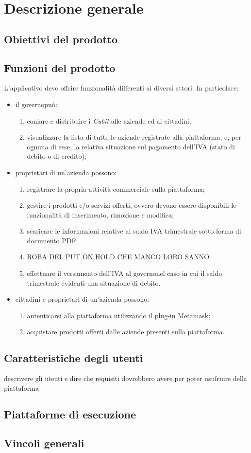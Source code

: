 \section{Descrizione generale} 
\subsection{Obiettivi del prodotto}

\subsection{Funzioni del prodotto}
L'applicativo devo offrire funzionalità differenti ai diversi attori. In particolare: 
\begin{itemize}
	\item il governo\glosp può:
	\begin{enumerate}[label=\alph*.]
		\item coniare e distribuire i \textit{Cubit} alle aziende ed ai cittadini;
		\item visualizzare la lista di tutte le aziende registrate alla piattaforma, e, per ognuna di esse, la relativa situazione sul pagamento dell'IVA (stato di debito o di credito); 
	\end{enumerate}
	
	\item proprietari di un'azienda possono:
	\begin{enumerate}[label=\alph*.]
		\item registrare la propria attività commerciale sulla piattaforma;
		\item gestire i prodotti e/o servizi offerti, ovvero devono essere disponibili le funzionalità di inserimento, rimozione e modifica;
		\item scaricare le informazioni relative al saldo IVA trimestrale sotto forma di documento PDF;
		\item ROBA DEL PUT ON HOLD CHE MANCO LORO SANNO
		\item effettuare il versamento dell'IVA al governo\glosp nel caso in cui il saldo trimestrale evidenti una situazione di debito.
	\end{enumerate}
	\item cittadini e proprietari di un'azienda possono:
		\begin{enumerate}[label=\alph*.]
			\item autenticarsi alla piattaforma utilizzando il plug-in Metamask\glo;
			\item acquistare prodotti offerti dalle aziende presenti sulla piattaforma.
	\end{enumerate}
\end{itemize}
\subsection{Caratteristiche degli utenti}
descrivere gli utenti e dire che requisiti dovrebbero avere per poter usufruire della piattaforma
\subsection{Piattaforme di esecuzione}
\subsection{Vincoli generali}

 
